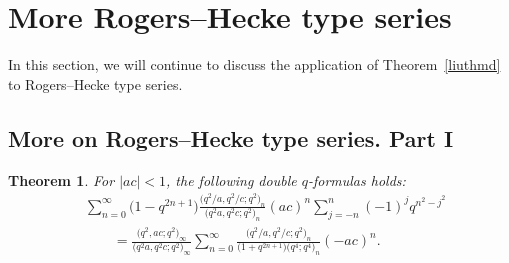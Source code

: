\documentclass[pdftex]{sigma}
\numberwithin{equation}{section}
\newtheorem{Theorem}{Theorem}[section]
\begin{document}
\section{More Rogers--Hecke type series}\label{sec8}
In this section, we will continue to discuss the application of Theorem~\ref{liuthmd} to Rogers--Hecke type series.
\subsection{More on Rogers--Hecke type series. Part I}
\begin{Theorem}\label{rogersheck:n1} For $|ac|<1$, the following double $q$-formulas holds:
\begin{align}
&\sum_{n=0}^\infty \bigl(1-q^{2n+1}\bigr) \frac{\bigl(q^2/a, q^2/c; q^2\bigr)_n}{\bigl(q^2 a, q^2c; q^2\bigr)_n} (ac)^n \sum_{j=-n}^n (-1)^j q^{n^2-j^2}\nonumber\\
&\qquad{}=\frac{\bigl(q^2, ac; q^2\bigr)_\infty}{\bigl(q^2 a, q^2 c; q^2\bigr)_\infty}	
\sum_{n=0}^\infty \frac{\bigl(q^2/a, q^2/c; q^2\bigr)_n}{\bigl(1+q^{2n+1}\bigr)\bigl(q^4; q^4\bigr)_n} (-ac)^n.\label{rht:eqn1}	
\end{align}
\end{Theorem}
\end{document}
